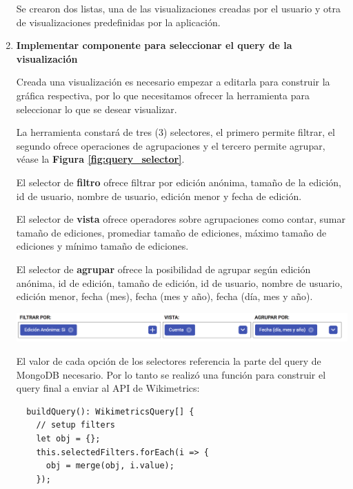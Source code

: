 \begin{enumerate}
  Se crearon dos listas, una de las visualizaciones creadas por el usuario y otra de visualizaciones predefinidas por la aplicación.
  
  \smallbreak
  \item\textbf{Implementar componente para seleccionar el query de la visualización}
  \smallbreak

  Creada una visualización es necesario empezar a editarla para construir la gráfica respectiva, por lo que necesitamos ofrecer la herramienta para seleccionar lo que se desear visualizar.
  
  La herramienta constará de tres (3) selectores, el primero permite filtrar, el segundo ofrece operaciones de agrupaciones y el tercero permite agrupar, véase la \textbf{Figura \ref{fig:query_selector}}.
  
  El selector de \textbf{filtro} ofrece filtrar por edición anónima, tamaño de la edición, id de usuario, nombre de usuario, edición menor y fecha de edición.
  
  El selector de \textbf{vista} ofrece operadores sobre agrupaciones como contar, sumar tamaño de ediciones, promediar tamaño de ediciones, máximo tamaño de ediciones y mínimo tamaño de ediciones.
  
  El selector de \textbf{agrupar} ofrece la posibilidad de agrupar según edición anónima, id de edición, tamaño de edición, id de usuario, nombre de usuario, edición menor, fecha (mes), fecha (mes y año), fecha (día, mes y año).
  
  
  \begin{center}
      \bigbreak
      \includegraphics[scale=0.3]{images/marco_aplicativo/query_selector.png}
      \label{fig:query_selector}
      \bigbreak
  \end{center}
  
  El valor de cada opción de los selectores referencia la parte del query de MongoDB necesario. Por lo tanto se realizó una función para construir el query final a enviar al API de Wikimetrics:
  
  \begin{verbatim}
  buildQuery(): WikimetricsQuery[] {
    // setup filters
    let obj = {};
    this.selectedFilters.forEach(i => {
      obj = merge(obj, i.value);
    });


\end{verbatim}
\end{enumerate}
